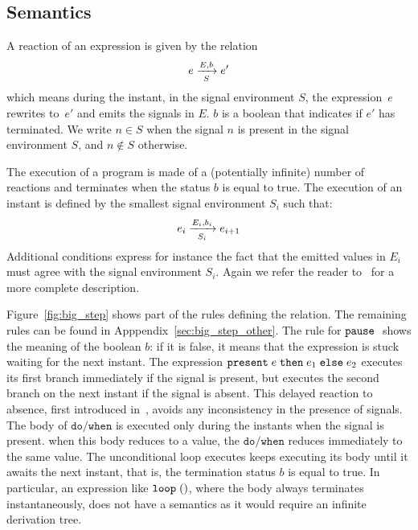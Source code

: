 \documentclass[9pt,preprint]{sigplanconf}
\begin{document}
\subsection{Semantics}

A reaction of an expression is given by the relation
\[  \bigstep{N}{e}{e'}{E}{b}{S} \]
which means during the instant, in the signal environment $S$, the expression~$e$ rewrites to~$e'$ and emits the signals in $E$. $b$ is a boolean that indicates if $e'$ has terminated. We write $n \in S$ when the signal $n$ is present in the signal environment $S$, and $n \not\in S$ otherwise.

The execution of a program is made of a (potentially infinite) number of reactions and terminates when the status $b$ is equal to true. The execution of an instant is defined by the smallest signal environment $S_i$ such that:
\[ \bigstep{N}{e_i}{e_{i+1}}{E_i}{b_i}{S_i} \]
Additional conditions express for instance the fact that the emitted values in $E_i$ must agree with the signal environment $S_i$. Again we refer the reader to~\cite{Mandel:2005} for a more complete description.



Figure~\ref{fig:big_step} shows part of the rules defining the relation. The remaining rules can be found in Apppendix~\ref{sec:big_step_other}. The rule for $\epause{}$ shows the meaning of the boolean $b$: if it is false, it means that the expression is stuck waiting for the next instant. The expression $\epres{e}{e_1}{e_2}$ executes its first branch immediately if the signal is present, but executes the second branch on the next instant if the signal is absent. This delayed reaction to absence, first introduced in~\cite{Boussinot:1991}, avoids any inconsistency in the presence of signals. The body of $\mathtt{do/when}$ is executed only during the instants when the signal is present. when this body reduces to a value, the $\mathtt{do/when}$ reduces immediately to the same value. The unconditional loop executes keeps executing its body until it awaits the next instant, that is, the termination status $b$ is equal to true. In particular, an expression like $\eloop{\evoid{}}$, where the body always terminates instantaneously, does not have a semantics as it would require an infinite derivation tree.

\begin{figure*}
\begin{small}

\end{small}


\caption{Big-step semantics}
\label{fig:big_step}
\end{figure*}
\end{document}
